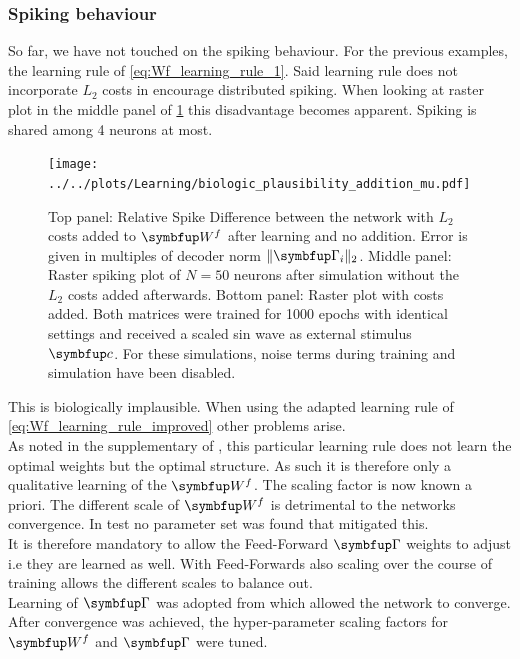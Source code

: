 \subsubsection{Spiking behaviour}
So far, we have not touched on the spiking behaviour. For the previous examples, the learning rule of \cref{eq:Wf_learning_rule_1}. Said learning rule does not incorporate $L_2$ costs in encourage distributed spiking.
When looking at raster plot in the middle panel of \cref{fig:Wf_learned_spikes} this disadvantage becomes apparent. Spiking is shared among 4 neurons at most.
\begin{figure}
	\centering
	\texttt{[image: ../../plots/Learning/biologic\_plausibility\_addition\_mu.pdf]}
	\caption{Top panel: Relative Spike Difference between the network with $L_2$ costs added to $\bmu{W}^f$ after learning and no addition. Error is given in multiples of decoder norm $\|\bmu{\Gamma}_i\|_2$. Middle panel: Raster spiking plot of $N=50$ neurons after simulation without the $L_2$ costs added afterwards. Bottom panel: Raster plot with costs added. Both matrices were trained for 1000 epochs with identical settings and received a scaled sin wave as external stimulus $\bmu{c}$. For these simulations, noise terms during training and simulation have been disabled.}
	\label{fig:Wf_learned_spikes}
\end{figure}
This is biologically implausible. When using the adapted learning rule of \cref{eq:Wf_learning_rule_improved} other problems arise.\\
As noted in the supplementary of \cite{brendel_learning_2020}, this particular learning rule does not learn the optimal weights but the optimal structure. As such it is therefore only a qualitative learning of the $\bmu{W}^f$. The scaling factor is now known a priori. The different scale of $\bmu{W}^f$ is detrimental to the networks convergence. In test no parameter set was found that mitigated this.\\
It is therefore mandatory to allow the Feed-Forward $\bmu{\Gamma}$ weights to adjust i.e they are learned as well. With Feed-Forwards also scaling over the course of training allows the different scales to balance out.\\
Learning of $\bmu{\Gamma}$ was adopted from \cite{brendel_learning_2020} which allowed the network to converge.\\
After convergence was achieved, the hyper-parameter scaling factors for $\bmu{W}^f$ and $\bmu{\Gamma}$ were tuned.\\
